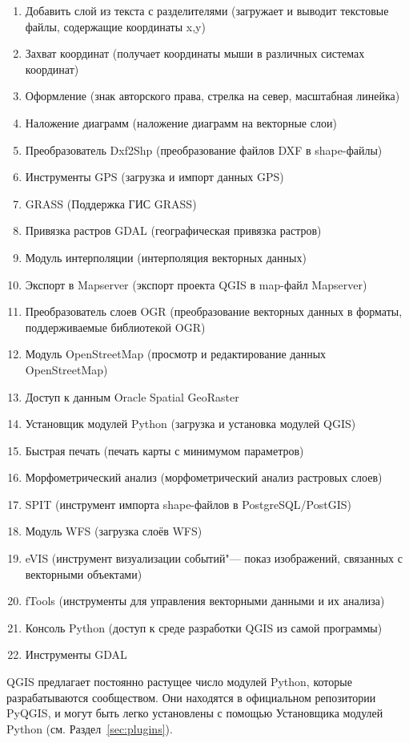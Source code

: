 \begin{enumerate}
\item Добавить слой из текста с разделителями (загружает и выводит
текстовые файлы, содержащие координаты x,y)
\item Захват координат (получает координаты мыши в различных системах
координат)
\item Оформление (знак авторского права, стрелка на север, масштабная
линейка)
\item Наложение диаграмм (наложение диаграмм на векторные слои)
\item Преобразователь Dxf2Shp (преобразование файлов DXF в shape-файлы)
\item Инструменты GPS (загрузка и импорт данных GPS)
\item GRASS (Поддержка ГИС GRASS)
\item Привязка растров GDAL (географическая привязка растров)
\item Модуль интерполяции (интерполяция векторных данных)
\item Экспорт в Mapserver (экспорт проекта QGIS в map-файл Mapserver)
\item Преобразователь слоев OGR (преобразование векторных данных в форматы,
поддерживаемые библиотекой OGR)
\item Модуль OpenStreetMap (просмотр и редактирование данных
OpenStreetMap)
\item Доступ к данным Oracle Spatial GeoRaster
\item Установщик модулей Python (загрузка и установка модулей QGIS)
\item Быстрая печать (печать карты с минимумом параметров)
\item Морфометрический анализ (морфометрический анализ растровых слоев)
\item SPIT (инструмент импорта shape-файлов в PostgreSQL/PostGIS)
\item Модуль WFS (загрузка слоёв WFS)
\item eVIS (инструмент визуализации событий"--- показ изображений, связанных
с векторными объектами)
\item fTools (инструменты для управления векторными данными и их анализа)
\item Консоль Python (доступ к среде разработки QGIS из самой программы)
\item Инструменты GDAL
\end{enumerate}


QGIS предлагает постоянно растущее число модулей Python, которые
разрабатываются сообществом. Они находятся в официальном
репозитории PyQGIS, и могут быть легко установлены с помощью Установщика
модулей Python (см. Раздел~\ref{sec:plugins}).

